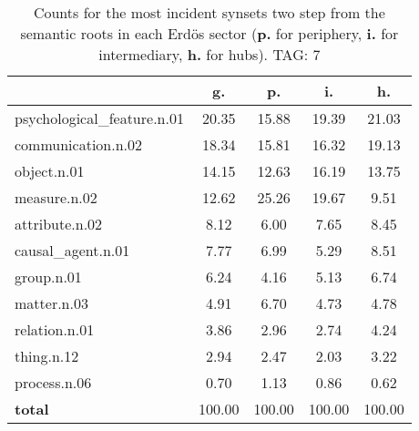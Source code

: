 \begin{table}[h!]
\begin{center}
\begin{tabular}{| l || c | c | c | c |}\hline
 & {\bf g.} & {\bf p.} & {\bf i.} & {\bf h.} \\\hline\hline
psychological\_feature.n.01 & 20.35  & 15.88  & 19.39  & 21.03 \\\hline
communication.n.02 & 18.34  & 15.81  & 16.32  & 19.13 \\\hline
object.n.01 & 14.15  & 12.63  & 16.19  & 13.75 \\\hline
measure.n.02 & 12.62  & 25.26  & 19.67  & 9.51 \\\hline
attribute.n.02 & 8.12  & 6.00  & 7.65  & 8.45 \\\hline
causal\_agent.n.01 & 7.77  & 6.99  & 5.29  & 8.51 \\\hline
group.n.01 & 6.24  & 4.16  & 5.13  & 6.74 \\\hline
matter.n.03 & 4.91  & 6.70  & 4.73  & 4.78 \\\hline
relation.n.01 & 3.86  & 2.96  & 2.74  & 4.24 \\\hline
thing.n.12 & 2.94  & 2.47  & 2.03  & 3.22 \\\hline
process.n.06 & 0.70  & 1.13  & 0.86  & 0.62 \\\hline\hline
{{\bf total}} & 100.00  & 100.00  & 100.00  & 100.00 \\\hline
\end{tabular}
\caption{Counts for the most incident synsets two step from the semantic roots in each Erd\"os sector ({\bf p.} for periphery, {\bf i.} for intermediary, {\bf h.} for hubs). TAG: 7}
\end{center}
\end{table}